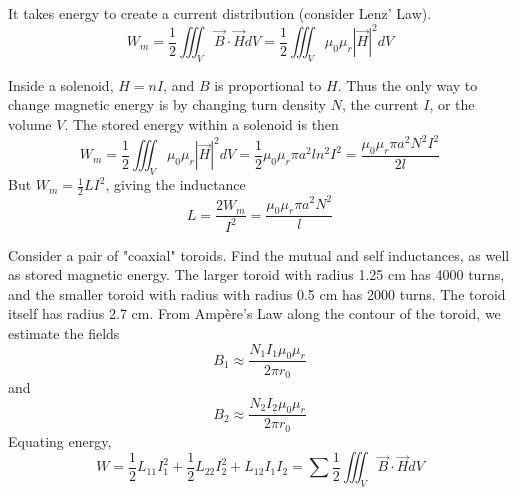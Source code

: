 \documentclass[12pt]{article}
\begin{document}
It takes energy to create a current distribution (consider Lenz' Law). 
$$W_m = \frac{1}{2} \iiint_V \vec B \cdot \vec H dV = \frac{1}{2} \iiint_V \mu_0\mu_r |\vec H|^2 dV$$

\begin{ex}[Solenoids]
    Inside a solenoid, $H = nI$, and $B$ is proportional to $H$. Thus the only way to change magnetic energy is by changing turn density $N$, the current $I$, or the volume $V$. The stored energy within a solenoid is then
    $$W_m = \frac{1}{2} \iiint_V \mu_0\mu_r |\vec H|^2 dV = \frac{1}{2} \mu_0\mu_r \pi a^2 l n^2I^2 = \frac{\mu_0\mu_r \pi a^2N^2I^2}{2l}$$
    But $W_m = \frac{1}{2} LI^2$, giving the inductance
    $$L = \frac{2W_m}{I^2} = \frac{\mu_0\mu_r \pi a^2 N^2}{l}$$
\end{ex}

\begin{ex}
    Consider a pair of "coaxial" toroids. Find the mutual and self inductances, as well as stored magnetic energy. The larger toroid with radius 1.25 cm has 4000 turns, and the smaller toroid with radius with radius 0.5 cm has 2000 turns. The toroid itself has radius 2.7 cm. From Amp\`ere's Law along the contour of the toroid, we estimate the fields
    $$B_1 \approx \frac{N_1I_1\mu_0\mu_r}{2\pi r_0}$$
    and
    $$B_2 \approx \frac{N_2I_2\mu_0\mu_r}{2\pi r_0}$$
    Equating energy,
    $$W = \frac{1}{2} L_{11}I_1^2 + \frac{1}{2} L_{22}I_2^2 + L_{12}I_1I_2 = \sum \frac{1}{2} \iiint_V \vec B \cdot \vec H dV$$
\end{ex}
\end{document}
